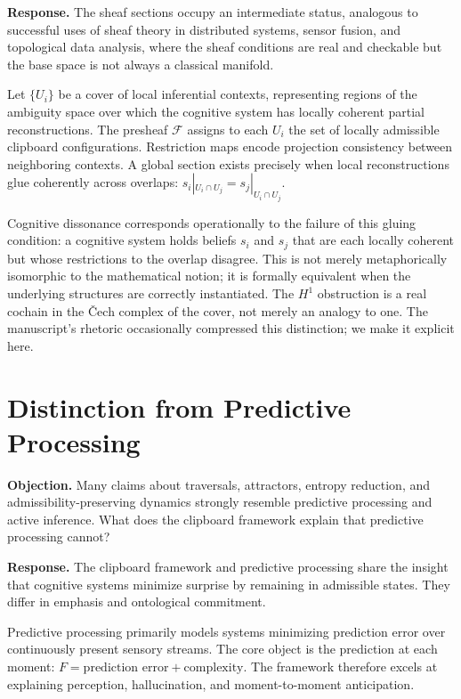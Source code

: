 \documentclass[12pt,oneside]{book}
\theoremstyle{plain}
\theoremstyle{definition}
\theoremstyle{plain}
\begin{document}
\textbf{Response.} The sheaf sections occupy an intermediate status, analogous to successful uses of sheaf theory in distributed systems, sensor fusion, and topological data analysis, where the sheaf conditions are real and checkable but the base space is not always a classical manifold.

Let $\{U_i\}$ be a cover of local inferential contexts, representing regions of the ambiguity space over which the cognitive system has locally coherent partial reconstructions. The presheaf $\mathcal{F}$ assigns to each $U_i$ the set of locally admissible clipboard configurations. Restriction maps encode projection consistency between neighboring contexts. A global section exists precisely when local reconstructions glue coherently across overlaps: $s_i|_{U_i \cap U_j} = s_j|_{U_i \cap U_j}$.

Cognitive dissonance corresponds operationally to the failure of this gluing condition: a cognitive system holds beliefs $s_i$ and $s_j$ that are each locally coherent but whose restrictions to the overlap disagree. This is not merely metaphorically isomorphic to the mathematical notion; it is formally equivalent when the underlying structures are correctly instantiated. The $H^1$ obstruction is a real cochain in the \v{C}ech complex of the cover, not merely an analogy to one. The manuscript's rhetoric occasionally compressed this distinction; we make it explicit here.

\section{Distinction from Predictive Processing}

\textbf{Objection.} Many claims about traversals, attractors, entropy reduction, and admissibility-preserving dynamics strongly resemble predictive processing and active inference. What does the clipboard framework explain that predictive processing cannot?

\textbf{Response.} The clipboard framework and predictive processing share the insight that cognitive systems minimize surprise by remaining in admissible states. They differ in emphasis and ontological commitment.

Predictive processing primarily models systems minimizing prediction error over continuously present sensory streams. The core object is the prediction at each moment: $F = \text{prediction error} + \text{complexity}$. The framework therefore excels at explaining perception, hallucination, and moment-to-moment anticipation.
\end{document}
